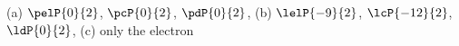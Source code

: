(a) $\pelP{0}{2}$, $\pcP{0}{2}$, $\pdP{0}{2}$, (b) $\lelP{-9}{2}$, $\lcP{-12}{2}$, $\ldP{0}{2}$, (c) only the electron
